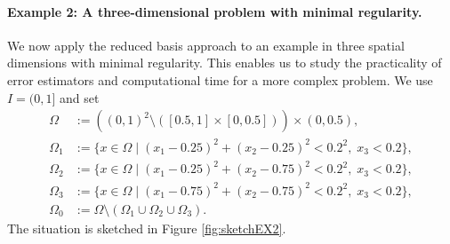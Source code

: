 \documentclass{article}
\theoremstyle{plain}
\theoremstyle{definition}
\theoremstyle{remark}
\begin{document}
\paragraph*{Example 2: A three-dimensional problem with minimal regularity.} We now apply the reduced basis approach to an example in three spatial dimensions with minimal regularity. This enables us to study the practicality of error estimators and computational time for a more complex problem. 
We use $I=(0,1]$ and set
\begin{align}
    \Omega &:= \left( (0,1)^2 \setminus ([0.5, 1] \times [0, 0.5])\right)\times (0, 0.5), \\
    \Omega_1 &:= \lbrace x \in \Omega \; \vert \; (x_1-0.25)^2 + (x_2-0.25)^2 < 0.2^2, \; x_3 < 0.2 \rbrace , \\
    \Omega_2 &:= \lbrace x \in \Omega \; \vert \; (x_1-0.25)^2 + (x_2-0.75)^2 < 0.2^2, \; x_3 < 0.2 \rbrace , \\
    \Omega_3 &:= \lbrace x \in \Omega \; \vert \; (x_1-0.75)^2 + (x_2-0.75)^2 < 0.2^2, \; x_3 < 0.2 \rbrace , \\
    \Omega_0 &:= \Omega \setminus (\Omega_1 \cup \Omega_2 \cup \Omega_3) .
\end{align}
The situation is sketched in Figure \ref{fig:sketchEX2}. 
\end{document}
